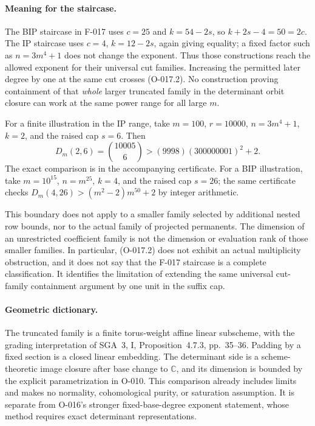 \paragraph{Meaning for the staircase.}
The BIP staircase in F-017 uses $c=25$ and
$k=54-2s$, so $k+2s-4=50=2c$. The IP staircase
uses $c=4$, $k=12-2s$, again giving equality; a fixed
factor such as $n=3m^4+1$ does not change the exponent.
Thus those constructions reach the allowed exponent for
their universal cut families. Increasing the permitted later
degree by one at the same cut crosses (O-017.2).
No construction proving containment of that \emph{whole}
larger truncated family in the determinant orbit closure can
work at the same power range for all large $m$.

For a finite illustration in the IP range, take $m=100$,
$r=10000$, $n=3m^4+1$, $k=2$, and the raised cap $s=6$.
Then
\[
 D_m(2,6)=\binom{10005}{6}>(9998)(300000001)^2+2.
\]
The exact comparison is in the accompanying certificate.
For a BIP illustration, take $m=10^{15}$, $n=m^{25}$,
$k=4$, and the raised cap $s=26$; the same certificate
checks $D_m(4,26)>(m^2-2)m^{50}+2$ by integer arithmetic.

This boundary does not apply to a smaller family selected
by additional nested row bounds, nor to the actual family
of projected permanents. The dimension of an unrestricted
coefficient family is not the dimension or evaluation rank
of those smaller families. In particular, (O-017.2) does
not exhibit an actual multiplicity obstruction, and it does
not say that the F-017 staircase is a complete classification.
It identifies the limitation of extending the same universal
cut-family containment argument by one unit in the suffix cap.

\paragraph{Geometric dictionary.}
The truncated family is a finite torus-weight affine linear
subscheme, with the grading interpretation of SGA~3, I,
Proposition~4.7.3, pp.~35--36. Padding by a fixed section
is a closed linear embedding. The determinant side is a
scheme-theoretic image closure after base change to
$\mathbb C$, and its dimension is bounded by the explicit
parametrization in O-010. This comparison already includes
limits and makes no normality, cohomological purity, or
saturation assumption. It is separate from O-016's stronger
fixed-base-degree exponent statement, whose method requires
exact determinant representations.
